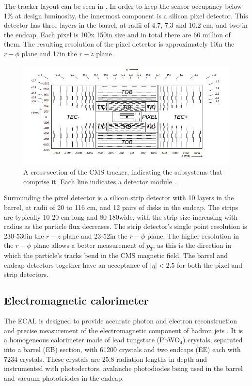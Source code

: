 The tracker layout can be seen in . In order to keep the sensor occupancy below 1\% at design luminosity, the innermost component is a silicon pixel detector. This detector has three layers in the barrel, at radii of 4.7, 7.3 and 10.2 cm, and two in the endcap. Each pixel is 100\micron x 150\micron in size and in total there are 66 million of them. The resulting resolution of the pixel detector is approximately 10\micron in the $r-\phi$ plane and 17\micron in the $r-z$ plane \cite{trackerperformance}.

\begin{figure}
  \includegraphics[width=1.2\largefigwidth]{plots/detector/TrackerSchematic.png}
  \caption{A cross-section of the CMS tracker, indicating the subsystems that comprise it. Each line indicates a detector module \cite{Chatrchyan:2008aa}.}
  \label{fig:trackerschematic}
\end{figure}



Surrounding the pixel detector is a silicon strip detector with 10 layers in the barrel, at radii of 20 to 116 cm, and 12 pairs of disks in the endcap. The strips are typically 10-20 cm long and 80-180\micron wide, with the strip size increasing with radius as the particle flux decreases. The strip detector's single point resolution is 230-530\micron in the $r-z$ plane and 23-52\micron in the $r-\phi$ plane.  The higher resolution in the $r-\phi$ plane allows a better measurement of $p_{T}$, as this is the direction in which the particle's tracks bend in the CMS magnetic field. The barrel and endcap detectors together have an acceptance of $|\eta|<2.5$ for both the pixel and strip detectors.

\subsection{Electromagnetic calorimeter}
\label{sec:ECAL}
The \ac{ECAL} is designed to provide accurate photon and electron reconstruction and precise measurement of the electromagnetic component of hadron jets \cite{Chatrchyan:2008aa}. It is a homogeneous calorimeter made of lead tungstate (PbWO$_{4}$) crystals, separated into a barrel (\ac{EB}) section, with 61200 crystals and two endcaps (\ac{EE}) each with 7234 crystals. These crystals are 25.8 radiation lengths in depth and instrumented with photodectors, avalanche photodiodes being used in the barrel and vacuum phototriodes in the endcap. 

